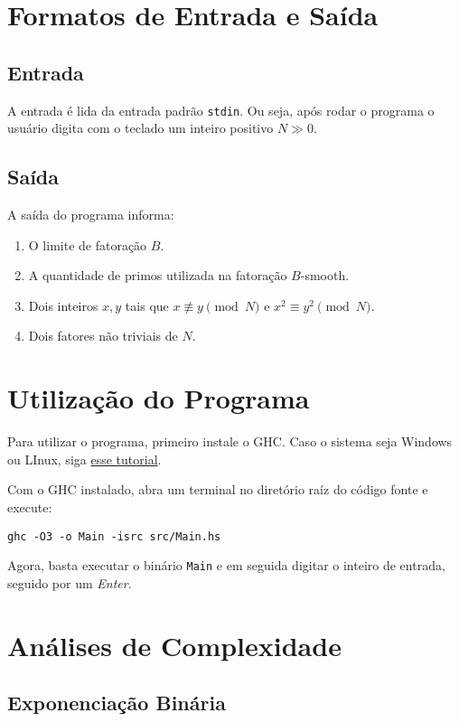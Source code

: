 \documentclass{article}
\begin{document}
\section{Formatos de Entrada e Saída}

\subsection{Entrada}

A entrada é lida da entrada padrão \verb|stdin|. Ou seja, após rodar o programa o usuário digita com o teclado um inteiro positivo $N \gg 0$.

\subsection{Saída}

A saída do programa informa:

\begin{enumerate}
    \item O limite de fatoração $B$.
    \item A quantidade de primos utilizada na fatoração $B$-smooth.
    \item Dois inteiros $x, y$ tais que $x \not\equiv y \pmod{N}$ e $x^2 \equiv y^2 \pmod{N}$.
    \item Dois fatores não triviais de $N$.
\end{enumerate}

\section{Utilização do Programa}

Para utilizar o programa, primeiro instale o GHC. Caso o sistema seja Windows ou LInux, siga \href{https://www.haskell.org/downloads/}{esse tutorial}.

Com o GHC instalado, abra um terminal no diretório raíz do código fonte e execute:

\verb|ghc -O3 -o Main -isrc src/Main.hs|

Agora, basta executar o binário \verb|Main| e em seguida digitar o inteiro de entrada, seguido por um \textit{Enter}.

\section{Análises de Complexidade}

\subsection{Exponenciação Binária}
\label{binExp}
\end{document}
